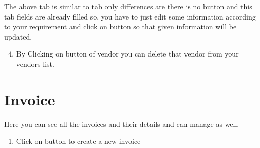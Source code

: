 \documentclass[letterpaper,10pt,english]{sphinxmanual}
\begin{document}
\begin{figure}[htbp]
\centering

\noindent{}
\end{figure}

The above tab is similar to  tab only differences are there is no  button and this tab fields are already filled so, you have to just edit some information according to your requirement and click on  button so that given information will be updated.
\begin{enumerate}
\setcounter{enumi}{3}
\item {} 
By Clicking on  button of vendor you can delete that vendor from your vendors list.

\end{enumerate}


\chapter{Invoice}
\label{\detokenize{setting::doc}}\label{\detokenize{setting:invoice}}
\begin{figure}[htbp]
\centering

\noindent{}
\end{figure}

Here you can see all the invoices and their details and can manage as well.
\begin{enumerate}
\item {} 
Click on  button to create a new invoice

\end{enumerate}

\begin{figure}[htbp]
\centering

\noindent{}
\end{figure}
\end{document}

